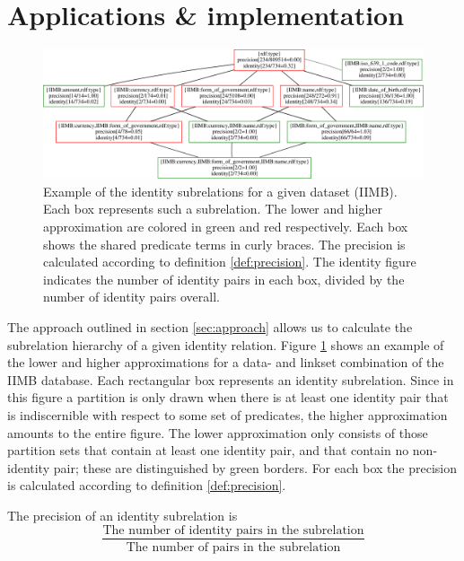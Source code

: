 \section{Applications \& implementation}
\label{sec:implementation}

\begin{figure}
\label{fig:ihierarchy}
\centering
\includegraphics[width=\textwidth]{./img/iimb_16_2}
\caption{
  Example of the identity subrelations for a given dataset (IIMB).
  Each box represents such a subrelation.
  The lower and higher approximation are colored in green and red
    respectively.
  Each box shows the shared predicate terms in curly braces.
  The precision is calculated according to definition \ref{def:precision}.
  The identity figure indicates the number of identity pairs in each box,
    divided by the number of identity pairs overall.
}
\end{figure}

The approach outlined in section \ref{sec:approach}
  allows us to calculate the subrelation hierarchy of
  a given identity relation.
Figure \ref{fig:ihierarchy} shows an example of the lower and higher
  approximations for a data- and linkset combination of the IIMB database.
Each rectangular box represents an identity subrelation.
Since in this figure a partition is only drawn when there is at least one
  identity pair that is indiscernible with respect to some set of
  predicates, the higher approximation amounts to the entire figure.
The lower approximation only consists of those partition sets that contain
  at least one identity pair, and that contain no non-identity pair;
  these are distinguished by green borders.
For each box the precision is calculated according to
  definition \ref{def:precision}.

\begin{definition}[Precision]
\label{def:precision}
The precision of an identity subrelation is
\[
  \frac{
    \text{The number of identity pairs in the subrelation}
  }{
    \text{The number of pairs in the subrelation}
  }
\]
\end{definition}

